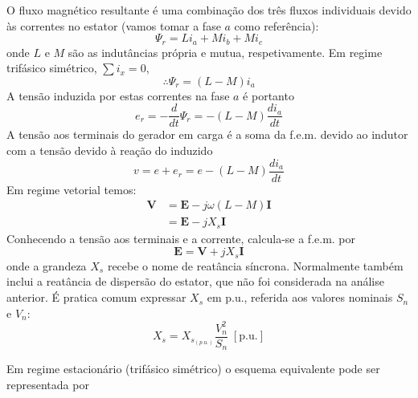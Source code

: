 O fluxo magnético resultante é uma combinação dos três fluxos individuais devido às correntes no estator (vamos tomar a fase $a$ como referência):
$$
    \Psi_r = L i_a + M i_b + M i_c
$$
onde $L$ e $M$ são as indutâncias própria e mutua, respetivamente. Em regime trifásico simétrico, $\sum i_x = 0$,
$$
    \therefore \Psi_r = (L - M) i_a
$$
A tensão induzida por estas correntes na fase $a$ é portanto
$$
    e_r = -\frac{d}{dt} \Psi_r = -(L - M) \frac{d i_a}{dt}
$$
A tensão aos terminais do gerador em carga é a soma da f.e.m. devido ao indutor com a tensão devido à reação do induzido
$$
    v = e + e_r = e - (L - M) \frac{d i_a}{dt}
$$
Em regime vetorial temos:
$$
    \begin{aligned}
        \mathbf{V} &= \mathbf{E} - j\omega(L - M) \mathbf{I} \\
                   &= \mathbf{E} - jX_s \mathbf{I}
    \end{aligned}
$$
Conhecendo a tensão aos terminais e a corrente, calcula-se a f.e.m. por
$$
    \mathbf{E} = \mathbf{V} + jX_s \mathbf{I}
$$
onde a grandeza $X_s$ recebe o nome de reatância síncrona. Normalmente também inclui a reatância de dispersão do estator, que não foi considerada na análise anterior. É pratica comum expressar $X_s$ em p.u., referida aos valores nominais $S_n$ e $V_n$:
$$
    X_s = X_{s_{(p.u.)}} \frac{V^2_n}{S_n}\; [\text{p.u.}]
$$

\clearpage
\noindent Em regime estacionário (trifásico simétrico) o esquema equivalente pode ser representada por

